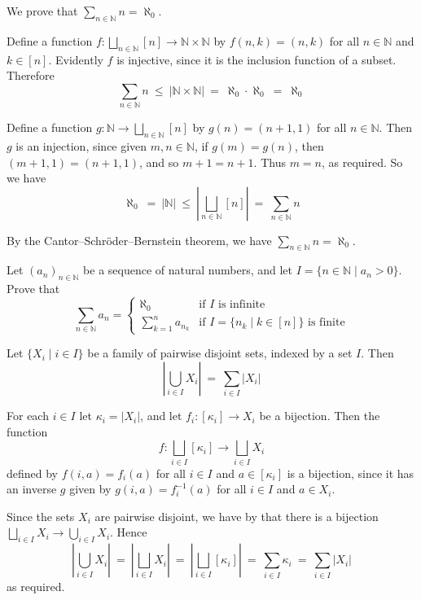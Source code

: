 \begin{example}
We prove that $\displaystyle \sum_{n \in \mathbb{N}} n = \aleph_0$.

Define a function $f : \displaystyle \bigsqcup_{n \in \mathbb{N}} [n] \to \mathbb{N} \times \mathbb{N}$ by $f(n,k) = (n,k)$ for all $n \in \mathbb{N}$ and $k \in [n]$. Evidently $f$ is injective, since it is the inclusion function of a subset. Therefore
\[ \sum_{n \in \mathbb{N}} n ~\le~ |\mathbb{N} \times \mathbb{N}| ~=~ \aleph_0 \cdot \aleph_0 ~=~ \aleph_0 \]

Define a function $g : \mathbb{N} \to \displaystyle \bigsqcup_{n \in \mathbb{N}} [n]$ by $g(n) = (n+1, 1)$ for all $n \in \mathbb{N}$. Then $g$ is an injection, since given $m,n \in \mathbb{N}$, if $g(m)=g(n)$, then $(m+1,1) = (n+1,1)$, and so $m+1=n+1$. Thus $m=n$, as required. So we have
\[ \aleph_0 ~=~ |\mathbb{N}| ~\le~ \left| \bigsqcup_{n \in \mathbb{N}} [n] \right| ~=~ \sum_{n \in \mathbb{N}} n \]

By the Cantor--Schr\"{o}der--Bernstein theorem, we have $\sum_{n \in \mathbb{N}} n = \aleph_0$.
\end{example}

\begin{exercise}
Let $(a_n)_{n \in \mathbb{N}}$ be a sequence of natural numbers, and let $I = \{ n \in \mathbb{N} \mid a_n > 0 \}$. Prove that
\[ \sum_{n \in \mathbb{N}} a_n = \begin{cases} \aleph_0 & \text{if $I$ is infinite} \\ \sum_{k=1}^n a_{n_k} & \text{if $I = \{ n_k \mid k \in [n] \}$ is finite} \end{cases} \]
\end{exercise}

\begin{lemma}
Let $\{ X_i \mid i \in I \}$ be a family of pairwise disjoint sets, indexed by a set $I$. Then
\[ \left| \bigcup_{i \in I} X_i \right| ~=~ \sum_{i \in I} |X_i| \]
\end{lemma}

\begin{cproof}
For each $i \in I$ let $\kappa_i = |X_i|$, and let $f_i : [\kappa_i] \to X_i$ be a bijection. Then the function
\[ f : \bigsqcup_{i \in I} [\kappa_i] \to \bigsqcup_{i \in I} X_i \]
defined by $f(i,a) = f_i(a)$ for all $i \in I$ and $a \in [\kappa_i]$ is a bijection, since it has an inverse $g$ given by $g(i,a) = f_i^{-1}(a)$ for all $i \in I$ and $a \in X_i$.

Since the sets $X_i$ are pairwise disjoint, we have by  that there is a bijection $\displaystyle \bigsqcup_{i \in I} X_i \to \bigcup_{i \in I} X_i$. Hence
\[ \left| \bigcup_{i \in I} X_i \right| ~=~ \left| \bigsqcup_{i \in I} X_i \right| ~=~ \left| \bigsqcup_{i \in I} [\kappa_i] \right| ~=~ \sum_{i \in I} \kappa_i ~=~ \sum_{i \in I} |X_i| \]
as required.
\end{cproof}

